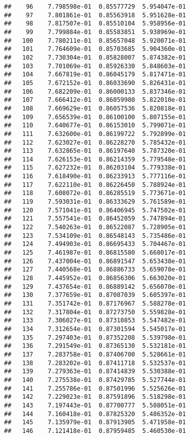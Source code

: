 \documentclass[]{article}
\begin{document}
\begin{verbatim}
##    96    7.798598e-01  0.85577729  5.954047e-01
##    97    7.801861e-01  0.85563918  5.951628e-01
##    98    7.817507e-01  0.85510104  5.958956e-01
##    99    7.799884e-01  0.85583851  5.938969e-01
##   100    7.780211e-01  0.85657048  5.920071e-01
##   101    7.764609e-01  0.85703685  5.904360e-01
##   102    7.730304e-01  0.85828007  5.874382e-01
##   103    7.701069e-01  0.85926330  5.848603e-01
##   104    7.667819e-01  0.86045179  5.817471e-01
##   105    7.672152e-01  0.86033690  5.826431e-01
##   106    7.682209e-01  0.86000133  5.837346e-01
##   107    7.666412e-01  0.86059980  5.822010e-01
##   108    7.669629e-01  0.86057536  5.820818e-01
##   109    7.656539e-01  0.86100100  5.807155e-01
##   110    7.640677e-01  0.86153010  5.799071e-01
##   111    7.632600e-01  0.86199722  5.792899e-01
##   112    7.623027e-01  0.86228270  5.785432e-01
##   113    7.632865e-01  0.86197640  5.787320e-01
##   114    7.626153e-01  0.86214359  5.779548e-01
##   115    7.627232e-01  0.86203104  5.779338e-01
##   116    7.618490e-01  0.86233913  5.777116e-01
##   117    7.622110e-01  0.86226450  5.788924e-01
##   118    7.608072e-01  0.86285519  5.773671e-01
##   119    7.593031e-01  0.86333629  5.761589e-01
##   120    7.571041e-01  0.86406945  5.747502e-01
##   121    7.557541e-01  0.86452059  5.747894e-01
##   122    7.540263e-01  0.86522087  5.728905e-01
##   123    7.534109e-01  0.86548143  5.735486e-01
##   124    7.494903e-01  0.86695433  5.704467e-01
##   125    7.461987e-01  0.86815580  5.668017e-01
##   126    7.437004e-01  0.86891547  5.653438e-01
##   127    7.440568e-01  0.86886733  5.659078e-01
##   128    7.445952e-01  0.86856306  5.663020e-01
##   129    7.437654e-01  0.86889142  5.656070e-01
##   130    7.377659e-01  0.87087039  5.605397e-01
##   131    7.351742e-01  0.87176967  5.588278e-01
##   132    7.317804e-01  0.87273750  5.559828e-01
##   133    7.306027e-01  0.87310853  5.547482e-01
##   134    7.312654e-01  0.87301594  5.545017e-01
##   135    7.297403e-01  0.87352208  5.539798e-01
##   136    7.291549e-01  0.87365130  5.532181e-01
##   137    7.283758e-01  0.87406700  5.528661e-01
##   138    7.283202e-01  0.87411718  5.532537e-01
##   139    7.279363e-01  0.87414839  5.530388e-01
##   140    7.275538e-01  0.87429785  5.527744e-01
##   141    7.255786e-01  0.87501996  5.525626e-01
##   142    7.229023e-01  0.87591896  5.518298e-01
##   143    7.197443e-01  0.87700777  5.508051e-01
##   144    7.160418e-01  0.87825320  5.486352e-01
##   145    7.135979e-01  0.87913905  5.471958e-01
##   146    7.121418e-01  0.87959485  5.460530e-01

\end{verbatim}
\end{document}
